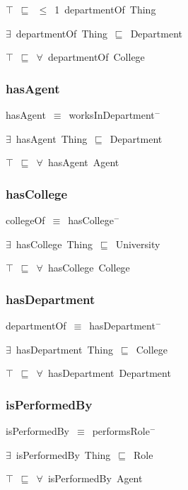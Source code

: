 \documentclass{article}
\begin{document}
\ensuremath{\top}~\ensuremath{\sqsubseteq}~\ensuremath{\leq}~1~departmentOf~Thing

\ensuremath{\exists}~departmentOf~Thing~\ensuremath{\sqsubseteq}~Department

\ensuremath{\top}~\ensuremath{\sqsubseteq}~\ensuremath{\forall}~departmentOf~College

\subsubsection*{hasAgent}

hasAgent~\ensuremath{\equiv}~worksInDepartment\ensuremath{^-}

\ensuremath{\exists}~hasAgent~Thing~\ensuremath{\sqsubseteq}~Department

\ensuremath{\top}~\ensuremath{\sqsubseteq}~\ensuremath{\forall}~hasAgent~Agent

\subsubsection*{hasCollege}

collegeOf~\ensuremath{\equiv}~hasCollege\ensuremath{^-}

\ensuremath{\exists}~hasCollege~Thing~\ensuremath{\sqsubseteq}~University

\ensuremath{\top}~\ensuremath{\sqsubseteq}~\ensuremath{\forall}~hasCollege~College

\subsubsection*{hasDepartment}

departmentOf~\ensuremath{\equiv}~hasDepartment\ensuremath{^-}

\ensuremath{\exists}~hasDepartment~Thing~\ensuremath{\sqsubseteq}~College

\ensuremath{\top}~\ensuremath{\sqsubseteq}~\ensuremath{\forall}~hasDepartment~Department

\subsubsection*{isPerformedBy}

isPerformedBy~\ensuremath{\equiv}~performsRole\ensuremath{^-}

\ensuremath{\exists}~isPerformedBy~Thing~\ensuremath{\sqsubseteq}~Role

\ensuremath{\top}~\ensuremath{\sqsubseteq}~\ensuremath{\forall}~isPerformedBy~Agent
\end{document}
